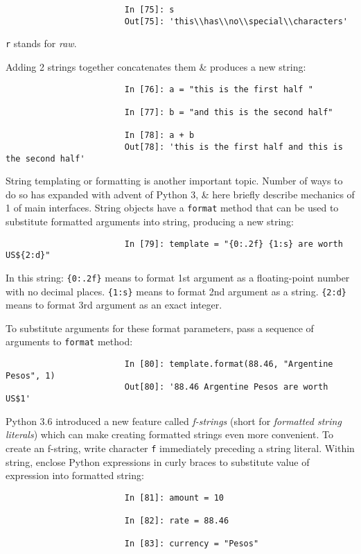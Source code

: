 \documentclass{article}
\begin{document}
\begin{enumerate}
\begin{itemize}
\begin{itemize}
\begin{itemize}
\begin{itemize}
\begin{verbatim}
						In [75]: s
						Out[75]: 'this\\has\\no\\special\\characters'
					\end{verbatim}
					{\tt r} stands for {\it raw}.
					
					Adding 2 strings together concatenates them \& produces a new string:
					\begin{verbatim}
						In [76]: a = "this is the first half "
						
						In [77]: b = "and this is the second half"
						
						In [78]: a + b
						Out[78]: 'this is the first half and this is the second half'
					\end{verbatim}
					String templating or formatting is another important topic. Number of ways to do so has expanded with advent of Python 3, \& here briefly describe mechanics of 1 of main interfaces. String objects have a {\tt format} method that can be used to substitute formatted arguments into string, producing a new string:
					\begin{verbatim}
						In [79]: template = "{0:.2f} {1:s} are worth US${2:d}"
					\end{verbatim}
					In this string: \verb|{0:.2f}| means to format 1st argument as a floating-point number with no decimal places. \verb|{1:s}| means to format 2nd argument as a string. \verb|{2:d}| means to format 3rd argument as an exact integer.
					
					To substitute arguments for these format parameters, pass a sequence of arguments to {\tt format} method:
					\begin{verbatim}
						In [80]: template.format(88.46, "Argentine Pesos", 1)
						Out[80]: '88.46 Argentine Pesos are worth US$1'
					\end{verbatim}
					Python 3.6 introduced a new feature called {\it f-strings} (short for {\it formatted string literals}) which can make creating formatted strings even more convenient. To create an f-string, write character {\tt f} immediately preceding a string literal. Within string, enclose Python expressions in curly braces to substitute value of expression into formatted string:
					\begin{verbatim}
						In [81]: amount = 10
						
						In [82]: rate = 88.46
						
						In [83]: currency = "Pesos"
						

\end{verbatim}
\end{itemize}
\end{itemize}
\end{itemize}
\end{itemize}
\end{enumerate}
\end{document}
